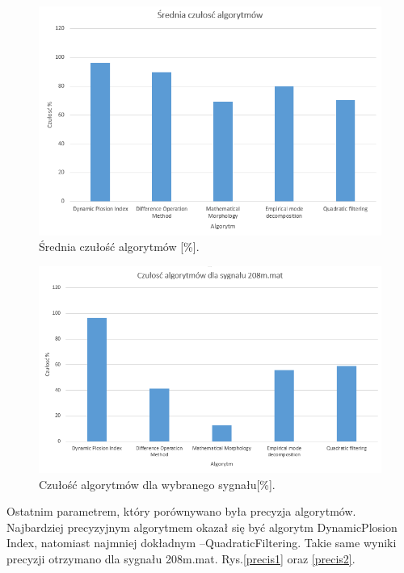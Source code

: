 \documentclass[10pt,a4paper]{article}
\begin{document}
\medskip
\begin{figure}[h!]
\centering
\includegraphics[width=\textwidth]{czulo1}
\caption{Średnia czułość algorytmów [\%]. }
\label{czulo1}
\end{figure} 
\FloatBarrier
\medskip

\medskip
\begin{figure}[h!]
\centering
\includegraphics[width=\textwidth]{czulo2}
\caption{Czułość algorytmów dla wybranego sygnału[\%]. }
\label{czulo2}
\end{figure} 
\FloatBarrier
\medskip

Ostatnim parametrem, który porównywano była precyzja algorytmów. Najbardziej precyzyjnym algorytmem okazał się być algorytm DynamicPlosion Index, natomiast najmniej dokładnym –QuadraticFiltering. Takie same wyniki precyzji otrzymano dla sygnału 208m.mat. Rys.\ref{precis1} oraz \ref{precis2}.
\end{document}
